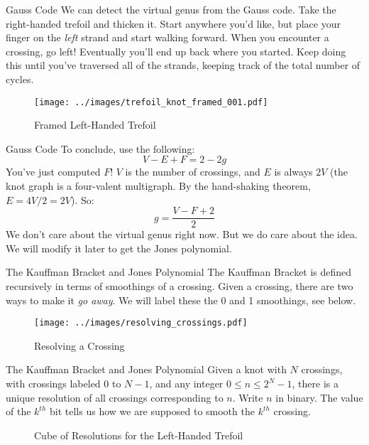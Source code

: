 \documentclass{beamer}
\begin{document}
    \begin{frame}{Gauss Code}
        We can detect the virtual genus from the Gauss code. Take the
        right-handed trefoil and thicken it. Start anywhere you'd like, but
        place your finger on the \textit{left} strand and start walking forward.
        When you encounter a crossing, go left! Eventually you'll end up back
        where you started. Keep doing this until you've traversed all of the
        strands, keeping track of the total number of cycles.
        \begin{figure}
            \centering
            \texttt{[image: ../images/trefoil\_knot\_framed\_001.pdf]}
            \caption{Framed Left-Handed Trefoil}
            \label{fig:trefoil_knot_framed_001}
        \end{figure}
    \end{frame}
    \begin{frame}{Gauss Code}
        To conclude, use the following:
        \begin{equation}
            V-E+F=2-2g
        \end{equation}
        You've just computed $F$! $V$ is the number of crossings, and
        $E$ is always $2V$ (the knot graph is a four-valent multigraph. By the
        hand-shaking theorem, $E=4V/2=2V$). So:
        \begin{equation}
            g=\frac{V-F+2}{2}
        \end{equation}
        We don't care about the virtual genus right now. But we do care about
        the idea. We will modify it later to get the Jones polynomial.
    \end{frame}
    \begin{frame}{The Kauffman Bracket and Jones Polynomial}
        The Kauffman Bracket is defined recursively in terms of smoothings of a
        crossing. Given a crossing, there are two ways to make it
        \textit{go away}. We will label these the 0 and 1 smoothings, see below.
        \begin{figure}
            \centering
            \texttt{[image: ../images/resolving\_crossings.pdf]}
            \caption{Resolving a Crossing}
            \label{fig:resolving_crossing}
        \end{figure}
    \end{frame}
    \begin{frame}{The Kauffman Bracket and Jones Polynomial}
        Given a knot with $N$ crossings, with crossings labeled 0 to $N-1$,
        and any integer $0\leq{n}\leq{2}^{N}-1$, there is a unique resolution of
        all crossings corresponding to $n$. Write $n$ in binary. The value of
        the $k^{th}$ bit tells us how we are supposed to smooth the $k^{th}$
        crossing.
        \begin{figure}
            \centering
            \caption{Cube of Resolutions for the Left-Handed Trefoil}
            \label{fig:trefoil_knot_cube_of_resolutions}
        \end{figure}
    \end{frame}
\end{document}
